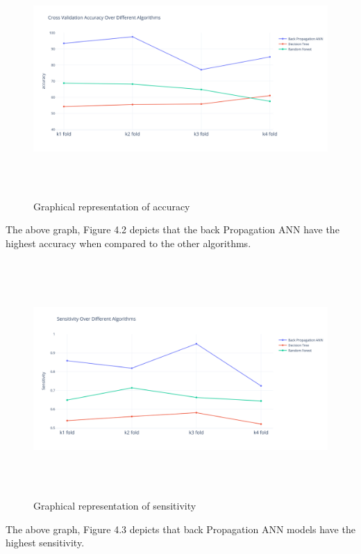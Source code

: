 \begin{figure}[H]
\begin{center}
\includegraphics[width=150mm,height=90mm]{comparisonnew/accuracy.png}
 \caption{Graphical representation of accuracy}
 \end{center}                
\end{figure}
The above graph, Figure 4.2 depicts that the back Propagation ANN  have  the  highest  accuracy  when  compared  to  the other algorithms.


\begin{figure}[H]
\begin{center}
\includegraphics[width=150mm,height=90mm]{comparisonnew/sensitivity.png}
 \caption{Graphical representation of sensitivity}
 \end{center}                
\end{figure}
The   above   graph, Figure 4.3 depicts  that    back Propagation ANN  models  have the highest sensitivity.

